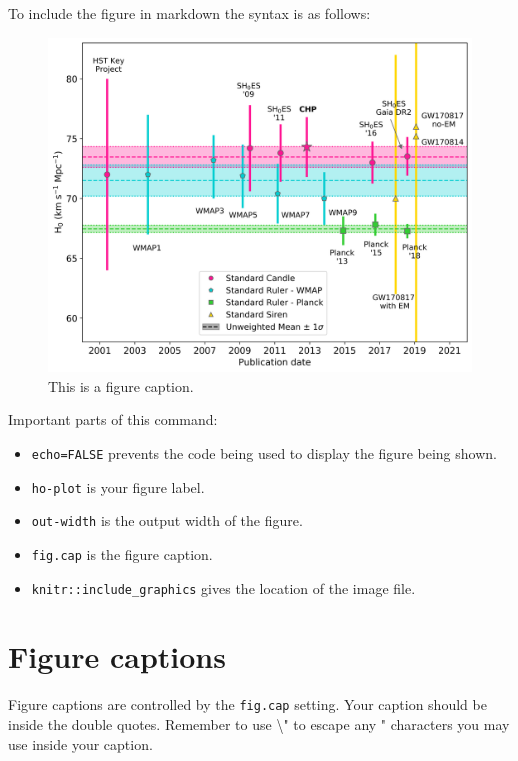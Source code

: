 \documentclass[]{book}
\newenvironment{Shaded}{\begin{snugshade}}{\end{snugshade}}
\newcommand{\BaseNTok}[1]{\textcolor[rgb]{0.00,0.00,0.81}{#1}}
\providecommand{\tightlist}{%
  \setlength{\itemsep}{0pt}\setlength{\parskip}{0pt}}
\begin{document}
To include the figure in markdown the syntax is as follows:

\begin{Shaded}
\end{Shaded}

\begin{figure}
\includegraphics[width=0.7\linewidth]{Images/ho-tension} \caption{This is a figure caption.}\label{fig:ho-plot}
\end{figure}

Important parts of this command:

\begin{itemize}
\tightlist
\item
  \texttt{echo=FALSE} prevents the code being used to display the figure being shown.
\item
  \texttt{ho-plot} is your figure label.
\item
  \texttt{out-width} is the output width of the figure.
\item
  \texttt{fig.cap} is the figure caption.
\item
  \texttt{knitr::include\_graphics} gives the location of the image file.
\end{itemize}

\hypertarget{sec:fig-captions}{%
\section{Figure captions}\label{sec:fig-captions}}

Figure captions are controlled by the \texttt{fig.cap} setting. Your caption should be inside the double quotes. Remember to use \textbackslash{}" to escape any " characters you may use inside your caption.
\end{document}
